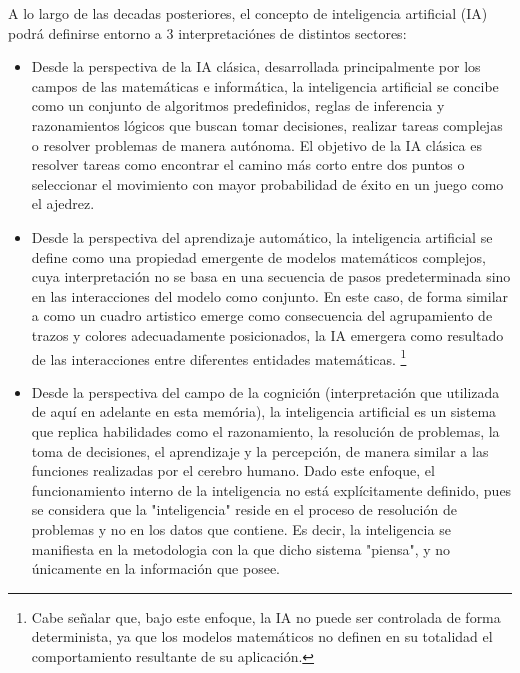 A lo largo de las decadas posteriores, el concepto de inteligencia artificial (IA) podrá
definirse entorno a 3 interpretaciónes de distintos sectores:

\begin{itemize}
    \item Desde la perspectiva de la IA clásica, desarrollada principalmente por
    los campos de las matemáticas e informática, la inteligencia artificial se
    concibe como un conjunto de algoritmos predefinidos, reglas de inferencia y
    razonamientos lógicos que buscan tomar decisiones, realizar tareas complejas
    o resolver problemas de manera autónoma. El objetivo de la IA clásica es
    resolver tareas como encontrar el camino más corto entre dos puntos o
    seleccionar el movimiento con mayor probabilidad de éxito en un juego como
    el ajedrez. 

    \item Desde la perspectiva del aprendizaje automático, la inteligencia
    artificial se define como una propiedad emergente de modelos matemáticos
    complejos, cuya interpretación no se basa en una secuencia de pasos
    predeterminada sino en las interacciones del modelo como conjunto. En este
    caso, de forma similar a como un cuadro artistico emerge como consecuencia
    del agrupamiento de trazos y colores adecuadamente posicionados, la IA
    emergera como resultado de las interacciones entre diferentes entidades
    matemáticas.  \footnote{Cabe señalar que, bajo este enfoque, la IA no puede
    ser controlada de forma determinista, ya que los modelos matemáticos no
    definen en su totalidad el comportamiento resultante de su aplicación.}

    \item Desde la perspectiva del campo de la cognición (interpretación que
    utilizada de aquí en adelante en esta memória), la inteligencia artificial
    es un sistema que replica habilidades como el razonamiento, la resolución de
    problemas, la toma de decisiones, el aprendizaje y la percepción, de manera
    similar a las funciones realizadas por el cerebro humano. Dado este enfoque,
    el funcionamiento interno de la inteligencia no está explícitamente
    definido, pues se considera que la "inteligencia" reside en el proceso de
    resolución de problemas y no en los datos que contiene. Es decir, la
    inteligencia se manifiesta en la metodologia con la que dicho sistema
    "piensa", y no únicamente en la información que posee.


\end{itemize}
